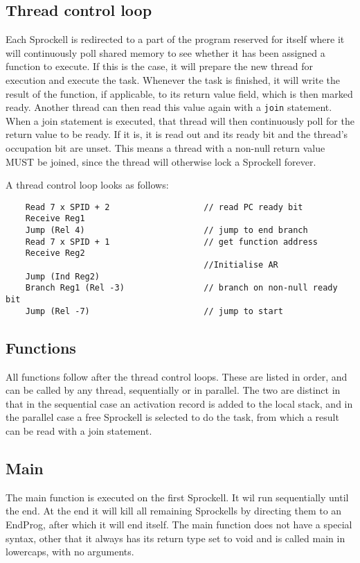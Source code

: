 \documentclass[10pt,a4paper]{report}
\begin{document}
\subsection{Thread control loop}
Each Sprockell is redirected to a part of the program reserved for itself where it will continuously poll shared memory to see whether it has been assigned a function to execute. If this is the case, it will prepare the new thread for execution and execute the task. Whenever the task is finished, it will write the result of the function, if applicable, to its return value field, which is then marked ready. Another thread can then read this value again with a \texttt{join} statement. When a join statement is executed, that thread will then continuously poll for the return value to be ready. If it is, it is read out and its ready bit and the thread's occupation bit are unset. This means a thread with a non-null return value MUST be joined, since the thread will otherwise lock a Sprockell forever. 

A thread control loop looks as follows:
\begin{lstlisting}
	Read 7 x SPID + 2					// read PC ready bit
	Receive Reg1
	Jump (Rel 4)						// jump to end branch
	Read 7 x SPID + 1					// get function address
	Receive Reg2
										//Initialise AR
	Jump (Ind Reg2)
	Branch Reg1 (Rel -3)				// branch on non-null ready bit
	Jump (Rel -7)						// jump to start
\end{lstlisting}


\subsection{Functions}
All functions follow after the thread control loops. These are listed in order, and can be called by any thread, sequentially or in parallel. The two are distinct in that in the sequential case an activation record is added to the local stack, and in the parallel case a free Sprockell is selected to do the task, from which a result can be read with a join statement.

\subsection{Main}
The main function is executed on the first Sprockell. It wil run sequentially until the end. At the end it will kill all remaining Sprockells by directing them to an EndProg, after which it will end itself. The main function does not have a special syntax, other that it always has its return type set to void and is called main in lowercaps, with no arguments.
\end{document}
